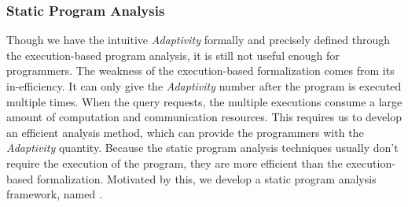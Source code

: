 \subsubsection{Static Program Analysis}
\label{sec:adapt-intro-static}
%
Though we have the intuitive \emph{Adaptivity} formally and precisely defined through the execution-based program analysis,
it is still not useful enough for programmers.
The weakness of the execution-based formalization comes from its in-efficiency.
It can only give the \emph{Adaptivity} number
after the program is executed multiple times.
When the query requests, the multiple executions consume a large amount of computation and communication resources.
This requires us to develop an efficient analysis method, 
which can provide the programmers with the \emph{Adaptivity} quantity.
Because the static program analysis techniques usually don't require the execution of the program,
they are more efficient than the execution-based formalization.
Motivated by this, we develop a static program analysis framework, named {\THESYSTEM}.
